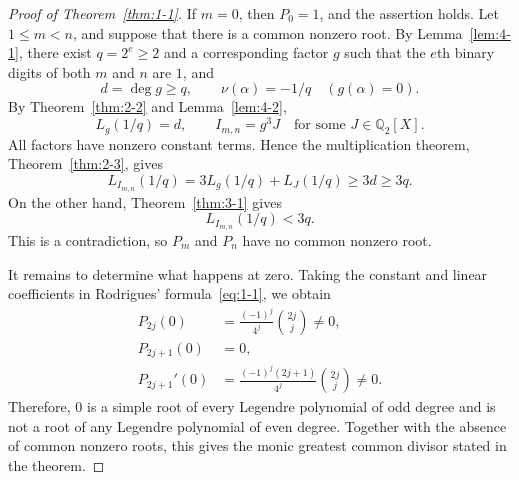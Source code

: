 \documentclass[11pt,a4paper]{article}
\numberwithin{equation}{section}
\theoremstyle{definition}
\begin{document}
\begin{proof}[Proof of Theorem~\ref{thm:1-1}]
If $m=0$, then $P_0=1$, and the assertion holds. Let $1\le m<n$, and suppose that there is a common nonzero root. By Lemma~\ref{lem:4-1}, there exist $q=2^e\ge2$ and a corresponding factor $g$ such that the $e$th binary digits of both $m$ and $n$ are $1$, and
\[
d=\deg g\ge q,\qquad
\nu(\alpha)=-1/q\quad(g(\alpha)=0).
\]
By Theorem~\ref{thm:2-2} and Lemma~\ref{lem:4-2},
\[
L_g(1/q)=d,\qquad
I_{m,n}=g^3J\quad\text{for some }J\in\mathbb{Q}_2[X].
\]
All factors have nonzero constant terms. Hence the multiplication theorem, Theorem~\ref{thm:2-3}, gives
\[
L_{I_{m,n}}(1/q)=3L_g(1/q)+L_J(1/q)\ge3d\ge3q.
\]
On the other hand, Theorem~\ref{thm:3-1} gives
\[
L_{I_{m,n}}(1/q)<3q.
\]
This is a contradiction, so $P_m$ and $P_n$ have no common nonzero root.

It remains to determine what happens at zero. Taking the constant and linear coefficients in Rodrigues' formula~\eqref{eq:1-1}, we obtain
\[
\begin{aligned}
P_{2j}(0)&=\frac{(-1)^j}{4^j}\binom{2j}{j}\ne0,\\
P_{2j+1}(0)&=0,\\
P_{2j+1}'(0)&=\frac{(-1)^j(2j+1)}{4^j}\binom{2j}{j}\ne0.
\end{aligned}
\]
Therefore, $0$ is a simple root of every Legendre polynomial of odd degree and is not a root of any Legendre polynomial of even degree. Together with the absence of common nonzero roots, this gives the monic greatest common divisor stated in the theorem.
\end{proof}
\end{document}
